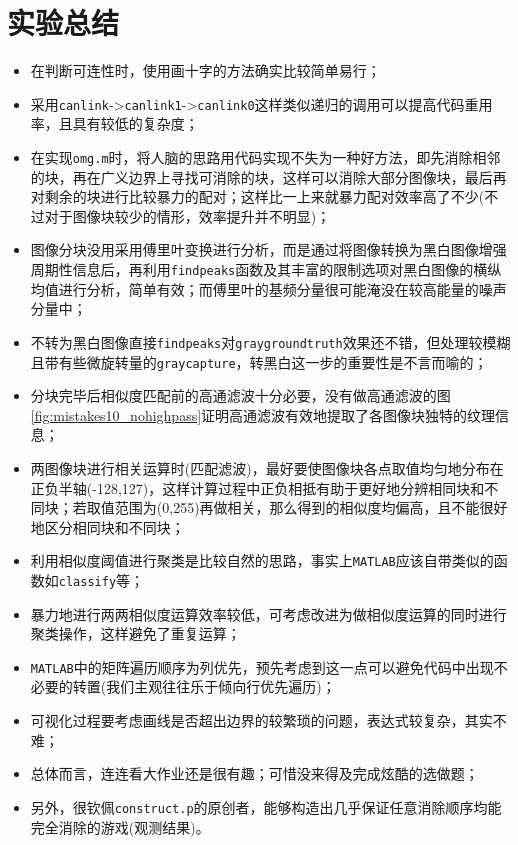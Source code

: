 \documentclass{article}
\numberwithin{figure}{section}
\numberwithin{table}{section}
\numberwithin{listing}{section}
\numberwithin{equation}{section}
\begin{document}
    \section{实验总结} %
    \label{sec:实验总结}

        \begin{itemize}
            \item 在判断可连性时，使用画十字的方法确实比较简单易行；
            \item 采用\texttt{canlink}->\texttt{canlink1}->\texttt{canlink0}这样类似递归的调用可以提高代码重用率，且具有较低的复杂度；
            \item 在实现\texttt{omg.m}时，将人脑的思路用代码实现不失为一种好方法，即先消除相邻的块，再在广义边界上寻找可消除的块，这样可以消除大部分图像块，最后再对剩余的块进行比较暴力的配对；这样比一上来就暴力配对效率高了不少(不过对于图像块较少的情形，效率提升并不明显)；
            \item 图像分块没用采用傅里叶变换进行分析，而是通过将图像转换为黑白图像增强周期性信息后，再利用\texttt{findpeaks}函数及其丰富的限制选项对黑白图像的横纵均值进行分析，简单有效；而傅里叶的基频分量很可能淹没在较高能量的噪声分量中；
            \item 不转为黑白图像直接\texttt{findpeaks}对\texttt{graygroundtruth}效果还不错，但处理较模糊且带有些微旋转量的\texttt{graycapture}，转黑白这一步的重要性是不言而喻的；
            \item 分块完毕后相似度匹配前的高通滤波十分必要，没有做高通滤波的图\ref{fig:mistakes10_nohighpass}证明高通滤波有效地提取了各图像块独特的纹理信息；
            \item 两图像块进行相关运算时(匹配滤波)，最好要使图像块各点取值均匀地分布在正负半轴(-128,127)，这样计算过程中正负相抵有助于更好地分辨相同块和不同块；若取值范围为(0,255)再做相关，那么得到的相似度均偏高，且不能很好地区分相同块和不同块；
            \item 利用相似度阈值进行聚类是比较自然的思路，事实上\texttt{MATLAB}应该自带类似的函数如\texttt{classify}等；
            \item 暴力地进行两两相似度运算效率较低，可考虑改进为做相似度运算的同时进行聚类操作，这样避免了重复运算；
            \item \texttt{MATLAB}中的矩阵遍历顺序为列优先，预先考虑到这一点可以避免代码中出现不必要的转置(我们主观往往乐于倾向行优先遍历)；
            \item 可视化过程要考虑画线是否超出边界的较繁琐的问题，表达式较复杂，其实不难；
            \item 总体而言，连连看大作业还是很有趣；可惜没来得及完成炫酷的选做题；
            \item 另外，很钦佩\texttt{construct.p}的原创者，能够构造出几乎保证任意消除顺序均能完全消除的游戏(观测结果)。
        \end{itemize}
    
\end{document}

